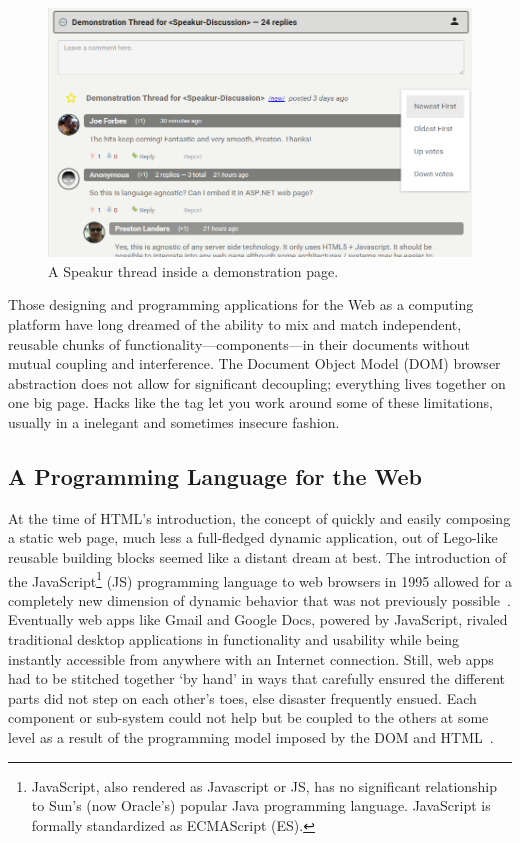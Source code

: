 \begin{figure}[htb]
\centering
 \includegraphics[width=\textwidth]{images/screenshot_20150312_1630_v2.png}
\caption{A Speakur thread inside a demonstration page.}
\label{f:demo1}
\end{figure}

Those designing and programming applications for the Web as a computing platform have long dreamed of the ability to mix and match independent, reusable chunks of functionality---components---in their documents without mutual coupling and interference. 
The Document Object Model (DOM)
browser abstraction does not allow for significant decoupling; 
everything lives together on one big page. Hacks like the 
tag let you work around some of these limitations, usually in a inelegant and sometimes insecure fashion.

\subsection{A Programming Language for the Web}
At the time of HTML's introduction, the concept of quickly and easily composing a static web page, 
much less a full-fledged dynamic application, 
out of Lego-like reusable building blocks seemed like a distant dream at best. 
The introduction of the 
JavaScript\footnote{JavaScript, also rendered as Javascript or JS, 
has no significant relationship to Sun's (now Oracle's) popular Java programming language. JavaScript is formally standardized as ECMAScript (ES).}
(JS) programming language to web browsers in 1995 allowed for a completely new dimension of dynamic behavior that was not previously possible~\cite{w3ccontributors2012}.
Eventually web apps like Gmail and Google Docs, powered by JavaScript, rivaled traditional desktop applications in functionality and usability while being instantly accessible from anywhere with an Internet connection.
Still, web apps had to be stitched together `by hand' in ways that carefully ensured the different parts did not step on each other's toes, else disaster frequently ensued. 
Each component or sub-system could not help but be coupled to the others at some level as a result of the programming model imposed by the DOM and HTML~\cite{ihrig2012}.

